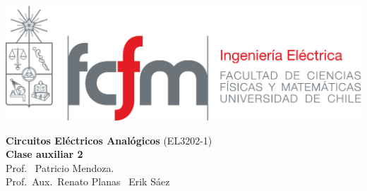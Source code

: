 \documentclass[
  11pt,
  letterpaper,
   addpoints,
   answers
  ]{exam}
\begin{document}
\noindent
\begin{minipage}{0.47\textwidth}
\includegraphics[width=\textwidth]{../fcfm_die}
\end{minipage}
\begin{minipage}{0.53\textwidth}
\begin{center} 
\large\textbf{Circuitos Eléctricos Analógicos} (EL3202-1) \\
\large\textbf{Clase auxiliar 2} \\
\normalsize Prof.~ Patricio Mendoza.\\
\normalsize Prof.~Aux.~Renato Planas ~Erik Sáez
\end{center}
\end{minipage}

\vspace{0.5cm}
\noindent
\vspace{.85cm}
\end{document}
